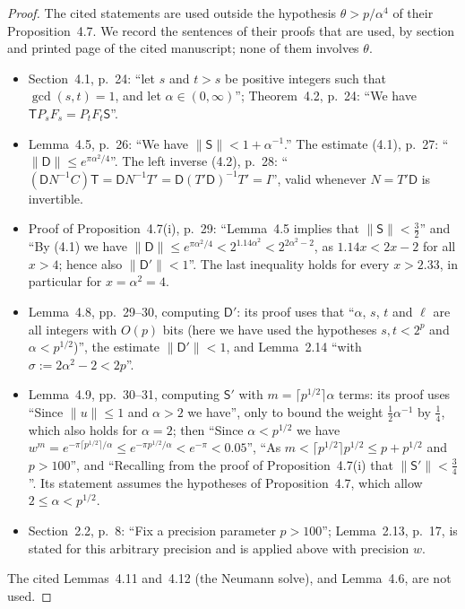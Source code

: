 \documentclass[11pt]{article}
\begin{document}
\begin{proof}
The cited statements are used outside the hypothesis $\theta>p/\alpha^4$ of
their Proposition~4.7. We record the sentences of their proofs that are
used, by section and printed page of the cited manuscript; none of them
involves $\theta$.
\begin{itemize}
\item Section~4.1, p.~24: ``let $s$ and $t>s$ be positive integers such that
$\gcd(s,t)=1$, and let $\alpha\in(0,\infty)$''; Theorem~4.2, p.~24: ``We have
$\mathsf TP_sF_s=P_tF_t\mathsf S$''.
\item Lemma~4.5, p.~26: ``We have $\|\mathsf S\|<1+\alpha^{-1}$.'' The
estimate (4.1), p.~27: ``$\|\mathsf D\|\le e^{\pi\alpha^2/4}$''. The left
inverse (4.2), p.~28: ``$(\mathsf DN^{-1}C)\mathsf T=\mathsf DN^{-1}T'
=\mathsf D(T'\mathsf D)^{-1}T'=I$'', valid whenever $N=T'\mathsf D$ is
invertible.
\item Proof of Proposition~4.7(i), p.~29: ``Lemma~4.5 implies that
$\|\mathsf S\|<\frac32$'' and ``By (4.1) we have
$\|\mathsf D\|\le e^{\pi\alpha^2/4}<2^{1.14\alpha^2}<2^{2\alpha^2-2}$, as
$1.14x<2x-2$ for all $x>4$; hence also $\|\mathsf D'\|<1$''. The last
inequality holds for every $x>2.33$, in particular for $x=\alpha^2=4$.
\item Lemma~4.8, pp.~29--30, computing $\mathsf D'$: its proof uses that
``$\alpha$, $s$, $t$ and $\ell$ are all integers with $O(p)$ bits (here we
have used the hypotheses $s,t<2^p$ and $\alpha<p^{1/2}$)'', the estimate
$\|\mathsf D'\|<1$, and Lemma~2.14 ``with $\sigma:=2\alpha^2-2<2p$''.
\item Lemma~4.9, pp.~30--31, computing $\mathsf S'$ with $m=\lceil p^{1/2}\rceil\alpha$
terms: its proof uses ``Since $\|u\|\le1$ and $\alpha>2$ we have'', only to
bound the weight $\frac12\alpha^{-1}$ by $\frac14$, which also holds for
$\alpha=2$; then ``Since $\alpha<p^{1/2}$ we have
$w^m=e^{-\pi\lceil p^{1/2}\rceil/\alpha}\le e^{-\pi p^{1/2}/\alpha}<e^{-\pi}<0.05$'',
``As $m<\lceil p^{1/2}\rceil p^{1/2}\le p+p^{1/2}$ and $p>100$'', and
``Recalling from the proof of Proposition~4.7(i) that $\|\mathsf S'\|<\frac34$''.
Its statement assumes the hypotheses of Proposition~4.7, which allow
$2\le\alpha<p^{1/2}$.
\item Section~2.2, p.~8: ``Fix a precision parameter $p>100$''; Lemma~2.13,
p.~17, is stated for this arbitrary precision and is applied above with
precision $w$.
\end{itemize}
The cited Lemmas~4.11 and~4.12 (the Neumann solve), and Lemma~4.6, are not
used.
\end{proof}
\end{document}

